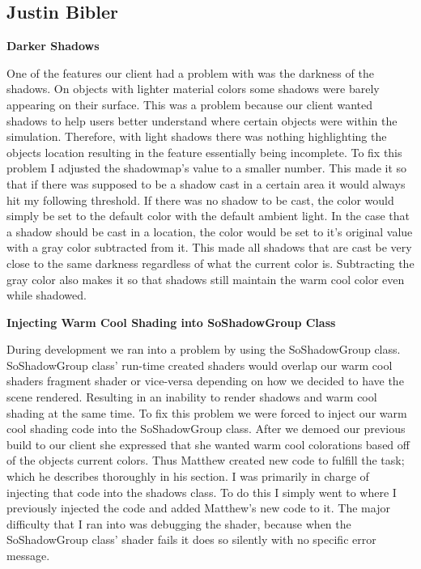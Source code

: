 \documentclass[10pt,journal,compsoc,draftclsnofoot]{IEEEtran}
\begin{document}
\begin{flushleft}
\subsection{Justin Bibler}

\textbf{Darker Shadows}
\par
One of the features our client had a problem with was the darkness of the shadows.
On objects with lighter material colors some shadows were barely appearing on their surface.
This was a problem because our client wanted shadows to help users better understand where certain objects were within the simulation.
Therefore, with light shadows there was nothing highlighting the objects location resulting in the feature essentially being incomplete.
To fix this problem I adjusted the shadowmap's value to a smaller number.
This made it so that if there was supposed to be a shadow cast in a certain area it would always hit my following threshold.
If there was no shadow to be cast, the color would simply be set to the default color with the default ambient light.
In the case that a shadow should be cast in a location, the color would be set to it's original value with a gray color subtracted from it.
This made all shadows that are cast be very close to the same darkness regardless of what the current color is.
Subtracting the gray color also makes it so that shadows still maintain the warm cool color even while shadowed.
\vspace{3mm}

\textbf{Injecting Warm Cool Shading into SoShadowGroup Class}
\par
During development we ran into a problem by using the SoShadowGroup class.
SoShadowGroup class' run-time created shaders would overlap our warm cool shaders fragment shader or vice-versa depending on how we decided to have the scene rendered.
Resulting in an inability to render shadows and warm cool shading at the same time.
To fix this problem we were forced to inject our warm cool shading code into the SoShadowGroup class.
After we demoed our previous build to our client she expressed that she wanted warm cool colorations based off of the objects current colors.
Thus Matthew created new code to fulfill the task; which he describes thoroughly in his section.
I was primarily in charge of injecting that code into the shadows class.
To do this I simply went to where I previously injected the code and added Matthew's new code to it.
The major difficulty that I ran into was debugging the shader, because when the SoShadowGroup class' shader fails it does so silently with no specific error message.
\vspace{3mm}


\end{flushleft}
\end{document}

